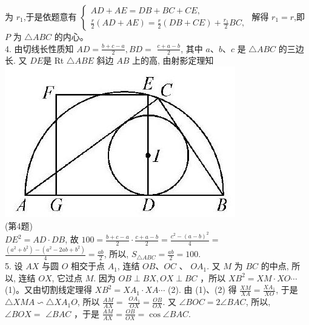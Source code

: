 \documentclass[10pt]{article}
\begin{document}
为 $r_{1}$,于是依题意有 $\left\{\begin{array}{l}A D+A E=D B+B C+C E, \\ \frac{r}{2}(A D+A E)=\frac{r}{2}(D B+C E)+\frac{r_{1}}{2} B C,\end{array}\right.$ 解得 $r_{1}=r$,即 $P$ 为 $\triangle A B C$ 的内心。\\
4. 由切线长性质知 $A D=\frac{b+c-a}{2}, B D=$ $\frac{c+a-b}{2}$, 其中 $a 、 b 、 c$ 是 $\triangle A B C$ 的三边长. 又 $D E$是 Rt $\triangle A B E$ 斜边 $A B$ 上的高, 由射影定理知\\
\includegraphics[max width=\textwidth, center]{2024_10_30_66b8e5e701da2093c133g-104}\\
(第4题)\\
$D E^{2}=A D \cdot D B$, 故 $100=\frac{b+c-a}{2} \cdot \frac{c+a-b}{2}=\frac{c^{2}-(a-b)^{2}}{4}=$ $\frac{\left(a^{2}+b^{2}\right)-\left(a^{2}-2 a b+b^{2}\right)}{4}=\frac{a b}{2}$, 所以, $S_{\triangle A B C}=\frac{a b}{2}=100$.\\
5. 设 $A X$ 与圆 $O$ 相交于点 $A_{1}$, 连结 $O B 、 O C$ 、 $O A_{1}$. 又 $M$ 为 $B C$ 的中点, 所以, 连结 $O X$, 它过点 $M$. 因为 $O B \perp B X, O X \perp B C$ ，所以 $X B^{2}=X M \cdot X O \cdots$ (1)。又由切割线定理得 $X B^{2}=X A_{1} \cdot X A \cdots$ (2). 由 (1)、(2) 得 $\frac{X M}{X A}=\frac{X A_{1}}{X O}$, 于是 $\triangle X M A \backsim \triangle X A_{1} O$, 所以 $\frac{A M}{A X}=$ $\frac{O A_{1}}{O X}=\frac{O B}{O X}$. 又 $\angle B O C=2 \angle B A C$, 所以, $\angle B O X=$ $\angle B A C$ ，于是 $\frac{A M}{A X}=\frac{O B}{O X}=\cos \angle B A C$.\\
\end{document}
